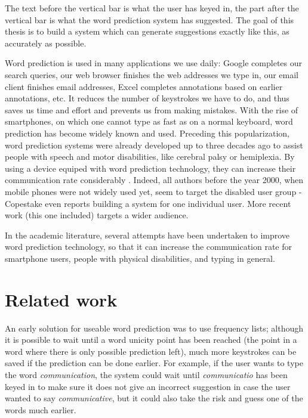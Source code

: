 \documentclass[11pt]{article}
\begin{document}
The text before the vertical bar is what the user has keyed in, the part after the vertical bar is what the word prediction system has suggested. The goal of this thesis is to build a system which can generate suggestions exactly like this, as accurately as possible. 

Word prediction is used in many applications we use daily: Google completes our search queries, our web browser finishes the web addresses we type in, our email client finishes email addresses, Excel completes annotations based on earlier annotations, etc. It reduces the number of keystrokes we have to do, and thus saves us time and effort and prevents us from making mistakes. With the rise of smartphones,  on which one  cannot type as fast as on a normal keyboard, word prediction has become widely known and used. Preceding this popularization, word prediction systems were already developed up to three decades ago to assist people with speech and motor disabilities, like cerebral palsy or hemiplexia. By using a device equiped with word prediction technology, they can increase their communication rate considerably \cite{Garay-Vitoria+06}. Indeed, all authors before the year 2000, when mobile phones were not widely used yet, seem to target the disabled user group - Copestake  even reports building a system for one individual user. More recent work (this one included) targets a wider audience.

In the academic literature, several attempts have been undertaken to improve word prediction technology, so that it can increase the communication rate for smartphone users, people with physical disabilities, and typing in general. 

\section{Related work}

An early solution for useable word prediction was to use frequency lists; although it is possible to wait until a word unicity point has been reached (the point in a word where there is only possible prediction left), much more keystrokes can be saved if the prediction can be done earlier. For example, if the user wants to type the word \emph{communication}, the system could wait until \emph{communicatio} has been keyed in to make sure it does not give an incorrect suggestion in case the user wanted to say \emph{communicative}, but it could also take the risk and guess one of the words much earlier. 
\end{document}

